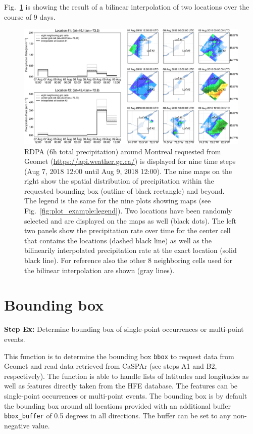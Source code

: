 \documentclass[10pt,a4paper,titlepage,parskip]{scrartcl}
\begin{document}
Fig.~\ref{fig:plot_example:bilinear} is showing the result of a bilinear interpolation of two locations over the course of 9 days.

\begin{figure}[h!]
	\centering
	\includegraphics[width=\linewidth]{figures/test-bilinear-interpolation.png}
	\caption{RDPA (6h total precipitation) around Montreal requested from Geomet (\url{https://api.weather.gc.ca/}) is displayed for nine time steps (Aug 7, 2018 12:00 until Aug 9, 2018 12:00). The nine maps on the right show the spatial distribution of precipitation within the requested bounding box (outline of black rectangle) and beyond. The legend is the same for the nine plots showing maps (see Fig.~\ref{fig:plot_example:legend}). Two locations have been randomly selected and are displayed on the maps as well (black dots). The left two panels show the precipitation rate over time for the center cell that contains the locations (dashed black line) as well as the bilinearily interpolated precipitation rate at the exact location (solid black line). For reference also the other 8 neighboring cells used for the bilinear interpolation are shown (gray lines).}
	\label{fig:plot_example:bilinear}
\end{figure}
\clearpage 

\section{Bounding box}

\textbf{Step Ex:} Determine bounding box of single-point occurrences or multi-point events.

This function is to determine the bounding box \texttt{bbox} to request data from Geomet and read data retrieved from CaSPAr (see steps A1 and B2, respectively). The function is able to handle lists of latitudes and longitudes as well as features directly taken from the HFE database. The features can be single-point occurrences or multi-point events. The bounding box is by default the bounding box around all locations provided with an additional buffer \texttt{bbox\_buffer} of 0.5 degrees in all directions. The buffer can be set to any non-negative value.
\end{document}
